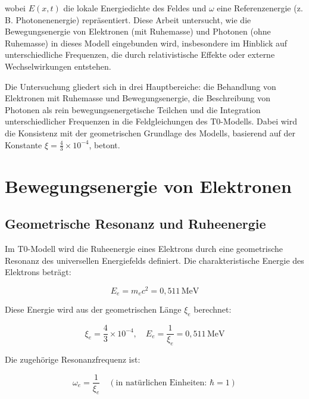 \documentclass[12pt,a4paper]{article}
\begin{document}
	wobei \( E(x,t) \) die lokale Energiedichte des Feldes und \(\omega\) eine Referenzenergie (z. B. Photonenenergie) repräsentiert. Diese Arbeit untersucht, wie die Bewegungsenergie von Elektronen (mit Ruhemasse) und Photonen (ohne Ruhemasse) in dieses Modell eingebunden wird, insbesondere im Hinblick auf unterschiedliche Frequenzen, die durch relativistische Effekte oder externe Wechselwirkungen entstehen.
	
	Die Untersuchung gliedert sich in drei Hauptbereiche: die Behandlung von Elektronen mit Ruhemasse und Bewegungsenergie, die Beschreibung von Photonen als rein bewegungsenergetische Teilchen und die Integration unterschiedlicher Frequenzen in die Feldgleichungen des T0-Modells. Dabei wird die Konsistenz mit der geometrischen Grundlage des Modells, basierend auf der Konstante \(\xi = \frac{4}{3} \times 10^{-4}\), betont.
	
	\section{Bewegungsenergie von Elektronen}
	\label{sec:electron_kinetic_energy}
	
	\subsection{Geometrische Resonanz und Ruheenergie}
	\label{subsec:electron_rest_energy}
	
	Im T0-Modell wird die Ruheenergie eines Elektrons durch eine geometrische Resonanz des universellen Energiefelds definiert. Die charakteristische Energie des Elektrons beträgt:
	
	\begin{equation}
		E_e = m_e c^2 = 0,511 \, \text{MeV}
	\end{equation}
	
	Diese Energie wird aus der geometrischen Länge \(\xi_e\) berechnet:
	
	\begin{equation}
		\xi_e = \frac{4}{3} \times 10^{-4}, \quad E_e = \frac{1}{\xi_e} = 0,511 \, \text{MeV}
		\label{eq:electron_energy}
	\end{equation}
	
	Die zugehörige Resonanzfrequenz ist:
	
	\begin{equation}
		\omega_e = \frac{1}{\xi_e} \quad (\text{in natürlichen Einheiten: } \hbar = 1)
	\end{equation}
	
\end{document}
